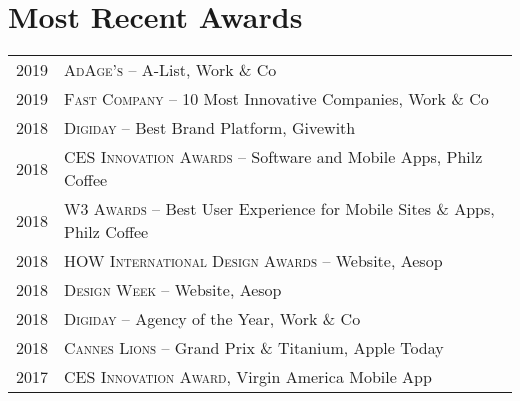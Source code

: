 \documentclass[a4paper,10pt]{article}
\begin{document}
\section{Most Recent Awards}
\begin{tabular}{rl}
  \textsc{2019} & \textsc{AdAge's} -- A-List, Work \& Co \\
  \textsc{2019} & \textsc{Fast Company} -- 10 Most Innovative Companies, Work \& Co \\
  \textsc{2018} & \textsc{Digiday} -- Best Brand Platform, Givewith \\
  \textsc{2018} & \textsc{CES Innovation Awards} -- Software and Mobile Apps, Philz Coffee \\
  \textsc{2018} & \textsc{W3 Awards} -- Best User Experience for Mobile Sites \& Apps, Philz Coffee \\
  \textsc{2018} & \textsc{HOW International Design Awards} -- Website, Aesop \\
  \textsc{2018} & \textsc{Design Week} -- Website, Aesop \\
  \textsc{2018} & \textsc{Digiday} -- Agency of the Year, Work \& Co \\
  \textsc{2018} & \textsc{Cannes Lions} -- Grand Prix \& Titanium, Apple Today\\
  \textsc{2017} & \textsc{CES Innovation Award}, Virgin America Mobile App \\
\end{tabular}


\end{document}
